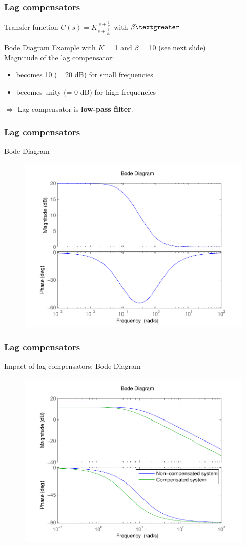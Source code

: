 \begin{frame}
	\frametitle{Lag compensators}
	\begin{block}{Transfer function}
		$C(s) = K\frac{s + \frac{1}{\tau}}{s + \frac{1}{\beta\tau}}$ with $\beta  \textgreater  1$
	\end{block}
	\begin{block}{Bode Diagram}
		Example with $K$ = 1 and $\beta$ = 10 (see next slide) \\ 
		Magnitude of the lag compensator: 
		\begin{itemize}
			\item becomes 10 (= 20 dB) for small frequencies
			\item becomes unity (= 0 dB) for high frequencies
		\end{itemize}
		$\Rightarrow$ Lag compensator is {\bf low-pass filter}.
		
	\end{block}
\end{frame}

\begin{frame}
\frametitle{Lag compensators}
\begin{block}{Bode Diagram}
	\begin{figure}
		\centering
		\includegraphics[width=0.5
		\linewidth]{bodelagislowpass}
	\end{figure}
\end{block}
\end{frame}

\begin{frame}
\frametitle{Lag compensators}
\begin{block}{Impact of lag compensators: Bode Diagram}
	\begin{figure}
		\centering
		\includegraphics[width=0.7
		\linewidth]{impactlagbetter}
	\end{figure}
\end{block}
\end{frame}

